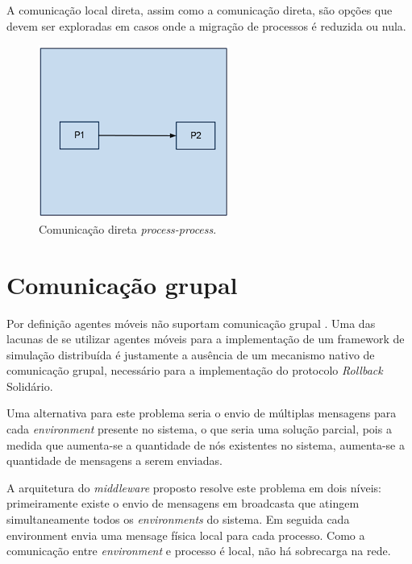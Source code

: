 A comunicação local direta, assim como a comunicação direta, são opções que devem ser exploradas em casos onde a migração de processos é reduzida ou nula.

\begin{figure}
  \centerline{\includegraphics{communication_superdirect.png}}
  \caption{Comunicação direta \textit{process-process}.}
\label{fig:direta_mesmo}
\end{figure}

\section{Comunicação grupal}

Por definição agentes móveis não suportam comunicação grupal \cite{}. Uma das lacunas de se utilizar agentes móveis para a implementação de um framework de simulação distribuída é justamente a ausência de um mecanismo nativo de comunicação grupal, necessário para a implementação do protocolo \textit{Rollback} Solidário.

Uma alternativa para este problema seria o envio de múltiplas mensagens para cada \textit{environment} presente no sistema, o que seria uma solução parcial, pois a medida que aumenta-se a quantidade de nós existentes no sistema, aumenta-se a quantidade de mensagens a serem enviadas.

A arquitetura do \textit{middleware} proposto resolve este problema em dois níveis: primeiramente existe o envio de mensagens em broadcasta que atingem simultaneamente todos os \textit{environments} do sistema. Em seguida cada environment envia uma mensage física local para cada processo. Como a comunicação entre \textit{environment} e processo é local, não há sobrecarga na rede.
